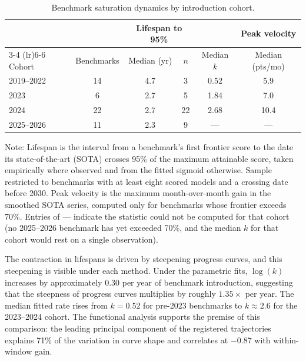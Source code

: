 \begin{table}[t]
\centering
\begin{threeparttable}
\caption{Benchmark saturation dynamics by introduction cohort.}
\label{tab:cohorts}
{\setlength{\tabcolsep}{3pt}\footnotesize
\begin{tabular}{lccccc}
\toprule
& & \multicolumn{2}{c}{Lifespan to 95\%} & & Peak velocity \\
\cmidrule(lr){3-4} \cmidrule(lr){6-6}
Cohort & Benchmarks & Median (yr) & $n$ & Median $k$ & Median (pts/mo) \\
\midrule
2019--2022 & 14 & 4.7 & 3  & 0.52 & 5.9 \\
2023       & 6  & 2.7 & 5  & 1.84 & 7.0 \\
2024       & 22 & 2.7 & 22 & 2.68 & 10.4 \\
2025--2026 & 11 & 2.3 & 9  & --- & --- \\
\bottomrule
\end{tabular}%
}
\begin{tablenotes}
\footnotesize
\item Note: Lifespan is the interval from a benchmark's first frontier score to the date its state-of-the-art (SOTA) crosses 95\% of the maximum attainable score, taken empirically where observed and from the fitted sigmoid otherwise. Sample restricted to benchmarks with at least eight scored models and a crossing date before 2030. Peak velocity is the maximum month-over-month gain in the smoothed SOTA series, computed only for benchmarks whose frontier exceeds 70\%. Entries of --- indicate the statistic could not be computed for that cohort (no 2025--2026 benchmark has yet exceeded 70\%, and the median $k$ for that cohort would rest on a single observation).
\end{tablenotes}
\end{threeparttable}
\end{table}

The contraction in lifespans is driven by steepening progress curves, and this steepening is visible under each method. Under the parametric fits, $\log(k)$ increases by approximately 0.30 per year of benchmark introduction, suggesting that the steepness of progress curves multiplies by roughly $1.35\times$ per year. The median fitted rate rises from $k = 0.52$ for pre-2023 benchmarks to $k \approx 2.6$ for the 2023--2024 cohort. The functional analysis supports the premise of this comparison: the leading principal component of the registered trajectories explains 71\% of the variation in curve shape and correlates at $-0.87$ with within-window gain.

